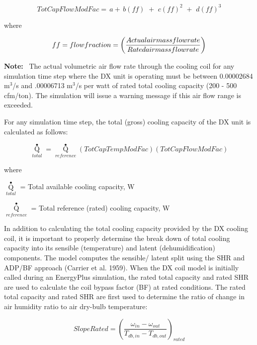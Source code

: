 \begin{equation}
TotCapFlowModFac = \,a + \,b\left( {ff} \right)\,\, + \,\,c{\left( {ff} \right)^2}\,\, + \,\,d{\left( {ff} \right)^3}
\end{equation}

where

\begin{equation}
ff = flow{\rm{ }}fraction = \left( {\frac{{Actual{\rm{ }}air{\rm{ }}mass{\rm{ }}flow{\rm{ }}rate}}{{Rated{\rm{ }}air{\rm{ }}mass{\rm{ }}flow{\rm{ }}rate}}} \right)
\end{equation}

\textbf{Note:}~ The actual volumetric air flow rate through the cooling coil for any simulation time step where the DX unit is operating must be between 0.00002684 m\(^{3}\)/s and .00006713 m\(^{3}\)/s per watt of rated total cooling capacity (200 - 500 cfm/ton). The simulation will issue a warning message if this air flow range is exceeded.

For any simulation time step, the total (gross) cooling capacity of the DX unit is calculated as follows:

\begin{equation}
{\mathop Q\limits^ \bullet_{total}} = {\mathop Q\limits^ \bullet_{reference}}\left( {TotCapTempModFac} \right)\left( {TotCapFlowModFac} \right)
\end{equation}

where

\({\mathop Q\limits^ \bullet_{total}}\) = Total available cooling capacity, W

\({\mathop Q\limits^ \bullet_{reference}}\) = Total reference (rated) cooling capacity, W

In addition to calculating the total cooling capacity provided by the DX cooling coil, it is important to properly determine the break down of total cooling capacity into its sensible (temperature) and latent (dehumidification) components. The model computes the sensible/ latent split using the SHR and ADP/BF approach (Carrier et al. 1959). When the DX coil model is initially called during an EnergyPlus simulation, the rated total capacity and rated SHR are used to calculate the coil bypass factor (BF) at rated conditions. The rated total capacity and rated SHR are first used to determine the ratio of change in air humidity ratio to air dry-bulb temperature:

\begin{equation}
SlopeRated = {\left( {\frac{{{\omega_{in}} - {\omega_{out}}}}{{{T_{db,in}} - {T_{db,out}}}}} \right)_{rated}}
\end{equation}

